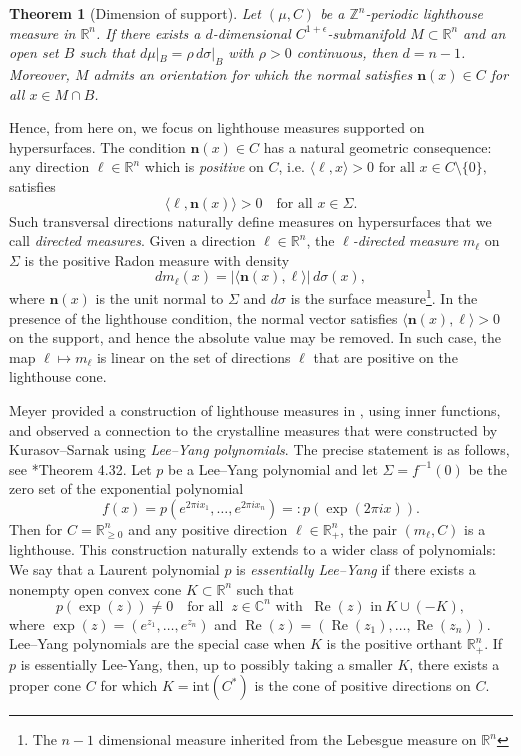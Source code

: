 \documentclass[11pt,letterpaper]{amsart}
\theoremstyle{definition}
\theoremstyle{plain}
\newtheorem{thm}[Def]{Theorem}
\newcommand{\nfield}{\mathbf n}
\newcommand{\Rea}{\operatorname{Re}}
\newcommand{\R}{{\mathbb R}}
\newcommand{\Z}{{\mathbb Z}}
\begin{document}
\begin{thm}[Dimension of support]\label{thm: dimension}
Let $(\mu,C)$ be a $\Z^n$-periodic lighthouse measure in $\R^n$. If there
exists a $d$-dimensional $C^{1+\epsilon}$-submanifold $M\subset\R^n$ and
an open set $B$ such that $d\mu|_B=\rho\,d\sigma|_B$ with $\rho>0$
continuous, then $d=n-1$. Moreover, $M$ admits an orientation for which
the normal satisfies $\nfield(x)\in C$ for all $x\in M\cap B$.
\end{thm}
Hence, from here on, we focus on lighthouse measures supported on hypersurfaces.
The condition $\nfield(x)\in C$ has a natural geometric consequence: 
any direction $\ell\in\R^n$ which is \emph{positive} on $C$, i.e.
$\langle \ell, x \rangle > 0 \text{ for all } x \in C \setminus \{0\},$ satisfies
\[
\langle \ell, \nfield(x) \rangle > 0 \quad \text{for all } x \in \Sigma.
\]
Such transversal directions naturally define measures on hypersurfaces that we call \emph{directed measures}. 
Given a direction $\ell\in\mathbb{R}^n$, the \emph{$\ell$-directed measure} $m_\ell$ on $\Sigma$ is the positive Radon measure with density
\[
dm_{\ell}(x)=|\langle \mathbf{n}(x),\ell\rangle|\,d\sigma(x),
\]
where $\mathbf{n}(x)$ is the unit normal to $\Sigma$ and $d\sigma$ is the surface measure\footnote{The $n-1$ dimensional measure inherited from the Lebesgue measure on $\R^n$}. In the presence of the lighthouse condition, the normal vector satisfies 
$\langle \mathbf{n}(x),\ell\rangle>0$ on the support, and hence the absolute value may be removed. In such case, the map $\ell\mapsto m_\ell$ is linear on the set of directions $\ell$ that are positive on the lighthouse cone.


Meyer provided a construction of lighthouse measures in \cite{Meyer2023}, using inner functions, and observed a connection to the crystalline measures that were constructed by Kurasov--Sarnak \cite{kurasovsarnak} using \emph{Lee--Yang polynomials}. The precise statement is as follows, see \cite{alon2025higher}*{Theorem 4.32}. Let $p$ be a Lee--Yang polynomial and let $\Sigma=f^{-1}(0)$ be the zero set of the exponential polynomial
\[
f(x)=p(e^{2\pi i x_{1}},\ldots,e^{2\pi i x_{n}})=:p(\exp(2\pi i x)).
\]
Then for $C=\R_{\ge0}^n$ and any positive direction $\ell\in \R_{+}^n$, the pair $(m_{\ell},C)$ is a lighthouse. 
This construction naturally extends to a wider class of polynomials:
We say that a Laurent polynomial $p$ is \emph{essentially Lee--Yang} if there exists a nonempty open convex cone $K \subset \mathbb{R}^n$ such that
\[
p(\exp(z)) \neq 0 \quad \text{for all \ }\   z \in \mathbb{C}^n \text{ with $\ \Rea (z)$ in}\    K \cup (-K),
\]
where $\exp(z)=(e^{z_1},\ldots,e^{z_n})$ and $\Rea (z)=(\Rea (z_1),\ldots,\Rea (z_n))$. Lee--Yang polynomials are the special case when $K$ is the positive orthant $\mathbb{R}_{+}^n$. If $p$ is essentially Lee-Yang, then, up to possibly taking a smaller $K$, there exists a proper cone $C$ for which $K=\mathrm{int}(C^{*})$ is the cone of positive directions on $C$. 
\end{document}

